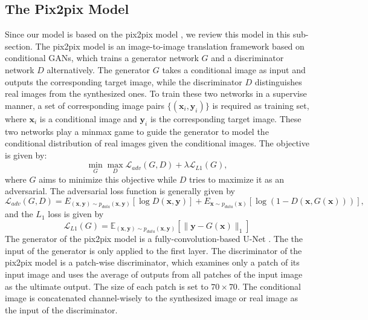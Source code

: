 \subsection{The Pix2pix Model}
\label{subsec:pix2pix}
Since our model is based on the pix2pix model \cite{pix2pix}, we review this model in this sub-section. The pix2pix model is an image-to-image translation framework based on conditional GANs, which trains a generator network $G$ and a discriminator network $D$ alternatively. The generator $G$ takes a conditional image as input and outputs the corresponding target image, while the discriminator $D$ distinguishes real images from the synthesized ones. To train these two networks in a supervise manner, a set of corresponding image pairs $\{(\bm{x}_i, \bm{y}_i)\}$ is required as training set, where $\bm{x}_i$ is a conditional image and $\bm{y}_i$ is the corresponding target image. These two networks play a minmax game to guide the generator to model the conditional distribution of real images given the conditional images. The objective is given by:
\begin{equation}
\label{eqn:minmax_game}
\min_G \max_D \mathcal{L}_{adv}(G,D)+\lambda \mathcal{L}_{L1}(G),
\end{equation}
where $G$ aims to minimize this objective while $D$ tries to maximize it as an adversarial.
The adversarial loss function is generally given by 
\begin{equation}
\label{eqn:loss_adv}
\mathcal{L}_{adv}(G,D)=E_{(\bm{x},\bm{y})\sim p_{data}(\bm{x},\bm{y})}[\log D(\bm{x},\bm{y})]+E_{\bm{x}\sim p_{data}(\bm{x})}[\log(1-D(\bm{x},G(\bm{x})))],
\end{equation}
and the $L_1$ loss is given by
\begin{equation}
\label{eqn:loss_l1}
\mathcal{L}_{L1}(G)=\mathbb{E}_{(\bm{x},\bm{y})\sim p_{data}(\bm{x},\bm{y})}[\|\bm{y}-G(\bm{x})\|_1]
\end{equation}
The generator of the pix2pix model is a fully-convolution-based U-Net \cite{Unet}. The the input of the generator is only applied to the first layer. The discriminator of the pix2pix model is a patch-wise discriminator, which examines only a patch of its input image and uses the average of outputs from all patches of the input image as the ultimate output. The size of each patch is set to $70\times 70$. The conditional image is concatenated channel-wisely to the synthesized image or real image as the input of the discriminator. 

